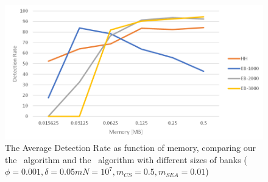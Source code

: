 \begin{figure}
    \includegraphics[width=\linewidth]{HH/figures/EB.png}
    \caption{The Average Detection Rate as function of memory, comparing our the \cs\ algorithm and the \eb\ algorithm with different sizes of banks ($\phi=0.001,\delta=0.05m N=10^7, m_{CS}=0.5, m_{SEA}=0.01$)}
    \label{figure5}
\end{figure}